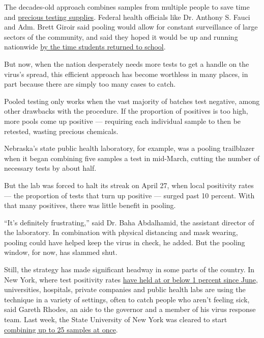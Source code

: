 The decades-old approach combines samples from multiple people to save
time and
\href{https://www.nytimes3xbfgragh.onion/2020/07/23/health/coronavirus-testing-supply-shortage.html}{precious
testing supplies}. Federal health officials like Dr. Anthony S. Fauci
and Adm. Brett Giroir said pooling would allow for constant surveillance
of large sectors of the community, and said they hoped it would be up
and running nationwide
\href{https://www.nytimes3xbfgragh.onion/2020/07/01/health/coronavirus-pooled-testing.html}{by
the time students returned to school}.

But now, when the nation desperately needs more tests to get a handle on
the virus's spread, this efficient approach has become worthless in many
places, in part because there are simply too many cases to catch.

Pooled testing only works when the vast majority of batches test
negative, among other drawbacks with the procedure. If the proportion of
positives is too high, more pools come up positive --- requiring each
individual sample to then be retested, wasting precious chemicals.

Nebraska's state public health laboratory, for example, was a pooling
trailblazer when it began combining five samples a test in mid-March,
cutting the number of necessary tests by about half.

But the lab was forced to halt its streak on April 27, when local
positivity rates --- the proportion of tests that turn up positive ---
surged past 10 percent. With that many positives, there was little
benefit in pooling.

``It's definitely frustrating,'' said Dr. Baha Abdalhamid, the assistant
director of the laboratory. In combination with physical distancing and
mask wearing, pooling could have helped keep the virus in check, he
added. But the pooling window, for now, has slammed shut.

Still, the strategy has made significant headway in some parts of the
country. In New York, where test positivity rates
\href{https://www.governor.ny.gov/news/governor-cuomo-announces-covid-19-infection-rate-below-1-percent-tenth-straight-day}{have
held at or below 1 percent since June}, universities, hospitals, private
companies and public health labs are using the technique in a variety of
settings, often to catch people who aren't feeling sick, said Gareth
Rhodes, an aide to the governor and a member of his virus response team.
Last week, the State University of New York was cleared to start
\href{https://www.governor.ny.gov/news/governor-cuomo-announces-new-testing-initiatives-improve-covid-19-detection-control-across-new}{combining
up to 25 samples at once}.

